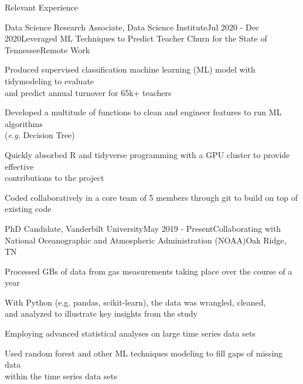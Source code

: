 \documentclass{resume} %
\begin{document}
\begin{rSection}{Relevant Experience}
\begin{rSubsection}{Data Science Research Associate, Data Science Institute}{Jul 2020 - Dec 2020}{Leveraged ML Techniques to Predict Teacher Churn for the State of Tennessee}{Remote Work} 
\item {Produced supervised classification machine learning (ML) model with tidymodeling to evaluate \\ and predict annual turnover for 65k+ teachers }
\item {Developed a multitude of functions to clean and engineer features to run ML algorithms \\ (\emph{e.g.} Decision Tree)}
\item {Quickly absorbed R and tidyverse programming with a GPU cluster to provide effective \\ contributions to the project}
\item {Coded collaboratively in a core team of 5 members through git to build on top of existing code}

\end{rSubsection} 


\begin{rSubsection}{PhD Candidate, Vanderbilt University}{May 2019 - Present}{Collaborating with National Oceanographic and Atmospheric Administration (NOAA)}{Oak Ridge, TN}
\item {Processed GBs of data from gas measurements taking place over the course of a year}
\item {With Python (e.g. pandas, scikit-learn), the data was wrangled, cleaned, \\ and analyzed to illustrate key insights from the study}
\item {Employing advanced statistical analyses on large time series data sets}
\item {Used random forest and other ML techniques modeling to fill gaps of missing data \\ within the time series data sets}

\end{rSubsection}



\end{rSection}
\end{document}
